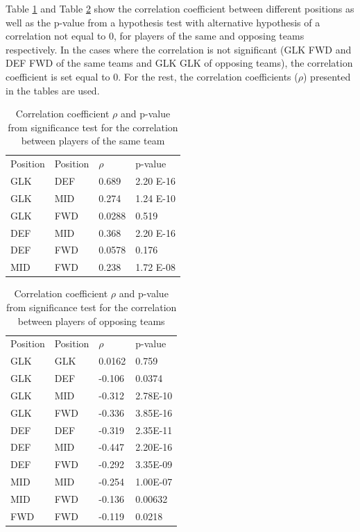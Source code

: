 Table \ref{tab:cor_team} and Table \ref{tab:cor_opp} show the correlation coefficient between different positions as well as the p-value from a hypothesis test with alternative hypothesis of a correlation not equal to 0, for players of the same and opposing teams respectively. In the cases where the correlation is not significant (GLK FWD and DEF FWD of the same teams and GLK GLK of opposing teams), the correlation coefficient is set equal to 0. For the rest, the correlation coefficients ($\rho$) presented in the tables are used.

\begin{table}[H]
\centering
\caption{Correlation coefficient $\rho$ and p-value from significance test for the correlation between players of the same team}
\label{tab:cor_team}
\begin{tabular}{llll}
Position & Position & $\rho$    & p-value  \\
GLK      & DEF      & 0.689  & 2.20 E-16 \\
GLK      & MID      & 0.274  & 1.24 E-10 \\
GLK      & FWD      & 0.0288 & 0.519    \\
DEF      & MID      & 0.368  & 2.20 E-16 \\
DEF      & FWD      & 0.0578 & 0.176    \\
MID      & FWD      & 0.238  & 1.72 E-08
\end{tabular}
\end{table}

\begin{table}[H]
\centering
\caption{Correlation coefficient $\rho$ and p-value from significance test for the correlation between players of opposing teams}
\label{tab:cor_opp}
\begin{tabular}{llll}
Position & Position & $\rho$    & p-value  \\
GLK      & GLK      & 0.0162 & 0.759    \\
GLK      & DEF      & -0.106 & 0.0374   \\
GLK      & MID      & -0.312 & 2.78E-10 \\
GLK      & FWD      & -0.336 & 3.85E-16 \\
DEF      & DEF      & -0.319 & 2.35E-11 \\
DEF      & MID      & -0.447 & 2.20E-16 \\
DEF      & FWD      & -0.292 & 3.35E-09 \\
MID      & MID      & -0.254 & 1.00E-07 \\
MID      & FWD      & -0.136 & 0.00632 \\
FWD      & FWD      & -0.119 & 0.0218  
\end{tabular}
\end{table}